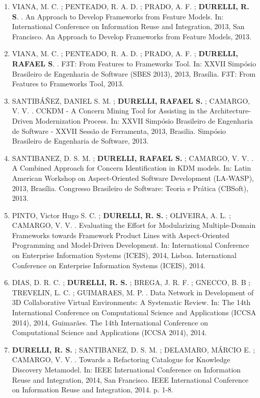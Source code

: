 \documentclass[12pt]{article}
\begin{document}
\begin{itemize}
\begin{enumerate}
		\item VIANA, M. C. ; PENTEADO, R. A. D. ; PRADO, A. F. ; \textbf{DURELLI, R. S}. . An Approach to Develop Frameworks from Feature Models. In: International Conference on Information Reuse and Integration, 2013, San Francisco. An Approach to Develop Frameworks from Feature Models, 2013.
		
		\item VIANA, M. C. ; PENTEADO, R. A. D. ; PRADO, A. F. ; \textbf{DURELLI, RAFAEL S}. . F3T: From Features to Frameworks Tool. In: XXVII Simpósio Brasileiro de Engenharia de Software (SBES 2013), 2013, Brasília. F3T: From Features to Frameworks Tool, 2013.
		
		\item SANTIBÁÑEZ, DANIEL S. M. ; \textbf{DURELLI, RAFAEL S.} ; CAMARGO, V. V. . CCKDM - A Concern Mining Tool for Assisting in the Architecture-Driven Modernization Process. In: XXVII Simpósio Brasileiro de Engenharia de Software - XXVII Sessão de Ferramenta, 2013, Brasilia. Simpósio Brasileiro de Engenharia de Software, 2013.
		
		\item SANTIBANEZ, D. S. M. ; \textbf{DURELLI, RAFAEL S.} ; CAMARGO, V. V. . A Combined Approach for Concern Identification in KDM models. In: Latin American Workshop on Aspect-Oriented Software Development (LA-WASP), 2013, Brasília. Congresso Brasileiro de Software: Teoria e Prática (CBSoft), 2013.
		
		\item PINTO, Victor Hugo S. C. ; \textbf{DURELLI, R. S.} ; OLIVEIRA, A. L. ; CAMARGO, V. V. . Evaluating the Effort for Modularizing Multiple-Domain Frameworks towards Framework Product Lines with Aspect-Oriented Programming and Model-Driven Development. In: International Conference on Enterprise Information Systems (ICEIS), 2014, Lisboa. International Conference on Enterprise Information Systems (ICEIS), 2014.
		
		\item DIAS, D. R. C. ; \textbf{DURELLI, R. S.} ; BREGA, J. R. F. ; GNECCO, B. B ; TREVELIN, L. C. ; GUIMARAES, M. P. . Data Network in Development of 3D Collaborative Virtual Environments: A Systematic Review. In: The 14th International Conference on Computational Science and Applications (ICCSA 2014), 2014, Guimarães. The 14th International Conference on Computational Science and Applications (ICCSA 2014), 2014.
		
		\item \textbf{DURELLI, R. S.} ; SANTIBANEZ, D. S. M. ; DELAMARO, MÁRCIO E. ; CAMARGO, V. V. . Towards a Refactoring Catalogue for Knowledge Discovery Metamodel. In: IEEE International Conference on Information Reuse and Integration, 2014, San Francisco. IEEE International Conference on Information Reuse and Integration, 2014. p. 1-8.
		

\end{enumerate}
\end{itemize}
\end{document}
